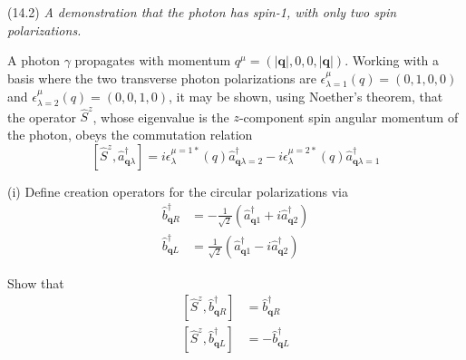 \documentclass[12pt]{article}
\begin{document}
(14.2)
{\it A demonstration that the photon has spin-1, with
only two spin polarizations.}

\bigskip
A photon $\gamma$ propagates with momentum
$q^\mu=(|\mathbf q|,0,0,|\mathbf q|)$.
Working with a basis where the two transverse photon polarizations are
$\epsilon_{\lambda=1}^\mu(q)=(0,1,0,0)$
and $\epsilon_{\lambda=2}^\mu(q)=(0,0,1,0)$, it may be
shown, using Noether's theorem, that the operator
$\hat S^z$, whose eigenvalue is the $z$-component spin
angular momentum of the photon, obeys the commutation relation
\begin{equation*}
\left[\hat S^z,\hat a_{\mathbf q\lambda}^\dag\right]
=i\epsilon_\lambda^{\mu=1*}(q)\hat a_{\mathbf q\lambda=2}^\dag
-i\epsilon_\lambda^{\mu=2*}(q)\hat a_{\mathbf q\lambda=1}^\dag
\tag{14.36}
\end{equation*}

(i) Define creation operators for the circular polarizations via
\begin{equation*}
\begin{aligned}
\hat b_{\mathbf qR}^\dag&=-\frac{1}{\sqrt2}
\left(\hat a_{\mathbf q1}^\dag+i\hat a_{\mathbf q2}^\dag\right)
\\
\hat b_{\mathbf qL}^\dag&=\frac{1}{\sqrt2}
\left(\hat a_{\mathbf q1}^\dag-i\hat a_{\mathbf q2}^\dag\right)
\end{aligned}
\tag{14.37}
\end{equation*}

Show that
\begin{equation*}
\begin{aligned}
\left[\hat S^z,\hat b_{\mathbf qR}^\dag\right]&=\hat b_{\mathbf qR}^\dag
\\
\left[\hat S^z,\hat b_{\mathbf qL}^\dag\right]&=-\hat b_{\mathbf qL}^\dag
\end{aligned}
\tag{14.38}
\end{equation*}
\end{document}
